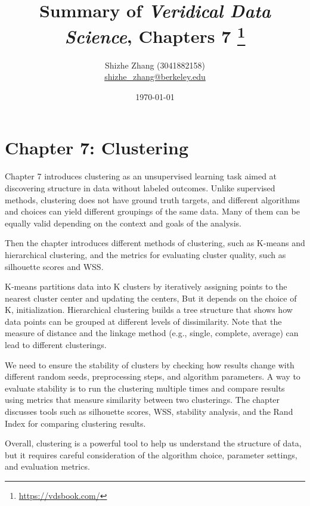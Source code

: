 \documentclass[letterpaper, 11pt]{article}
\title{\vspace{-1.5cm} Summary of \textit{Veridical Data Science}, Chapters 7 \footnote{\url{https://vdsbook.com/}}}
\author{Shizhe Zhang (3041882158)\\\href{mailto:shizhe\_zhang@berkeley.edu}{shizhe\_zhang@berkeley.edu}}
\date{\today}
\begin{document}
\hypersetup{colorlinks=true, linkcolor=blue, urlcolor=blue}
\maketitle

\section*{Chapter 7: Clustering}

Chapter 7 introduces clustering as an unsupervised learning task aimed at discovering structure in data without labeled outcomes.
Unlike supervised methods, clustering does not have ground truth targets, and different algorithms and choices can yield different groupings of the same data.
Many of them can be equally valid depending on the context and goals of the analysis.


Then the chapter introduces different methods of clustering, such as K-means and hierarchical clustering,
and the metrics for evaluating cluster quality, such as silhouette scores and WSS.


K-means partitions data into K clusters by iteratively assigning points to the nearest cluster center and updating the centers,
But it depends on the choice of K, initialization.
Hierarchical clustering builds a tree structure that shows how data points can be grouped at different levels of dissimilarity.
Note that the measure of distance and the linkage method (e.g., single, complete, average) can lead to different clusterings.

We need to ensure the stability of clusters by checking how results change with different random seeds, preprocessing steps, and algorithm parameters.
A way to evaluate stability is to run the clustering multiple times and compare results using metrics that measure similarity between two clusterings.
The chapter discusses tools such as silhouette scores, WSS, stability analysis, and the Rand Index for comparing clustering results.

Overall, clustering is a powerful tool to help us understand the structure of data, but it requires careful consideration of the algorithm choice, parameter settings, and evaluation metrics.
\end{document}
